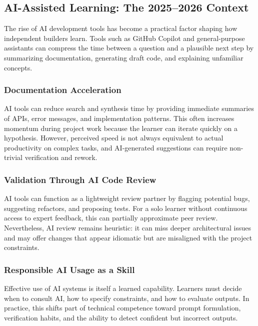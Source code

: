 \subsection{AI-Assisted Learning: The 2025--2026 Context}

The rise of AI development tools has become a practical factor shaping how independent builders learn. Tools such as GitHub Copilot and general-purpose assistants can compress the time between a question and a plausible next step by summarizing documentation, generating draft code, and explaining unfamiliar concepts.

\subsubsection{Documentation Acceleration}

AI tools can reduce search and synthesis time by providing immediate summaries of APIs, error messages, and implementation patterns. This often increases momentum during project work because the learner can iterate quickly on a hypothesis. However, perceived speed is not always equivalent to actual productivity on complex tasks, and AI-generated suggestions can require non-trivial verification and rework.

\subsubsection{Validation Through AI Code Review}

AI tools can function as a lightweight review partner by flagging potential bugs, suggesting refactors, and proposing tests. For a solo learner without continuous access to expert feedback, this can partially approximate peer review. Nevertheless, AI review remains heuristic: it can miss deeper architectural issues and may offer changes that appear idiomatic but are misaligned with the project constraints.

\subsubsection{Responsible AI Usage as a Skill}

Effective use of AI systems is itself a learned capability. Learners must decide when to consult AI, how to specify constraints, and how to evaluate outputs. In practice, this shifts part of technical competence toward prompt formulation, verification habits, and the ability to detect confident but incorrect outputs.

